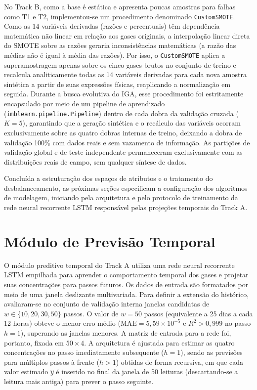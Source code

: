 No Track B, como a base é estática e apresenta poucas amostras para falhas como T1 e T2, implementou-se um procedimento denominado \texttt{CustomSMOTE}. Como as 14 variáveis derivadas (razões e percentuais) têm dependência matemática não linear em relação aos gases originais, a interpolação linear direta do SMOTE sobre as razões geraria inconsistências matemáticas (a razão das médias não é igual à média das razões). Por isso, o \texttt{CustomSMOTE} aplica a superamostragem apenas sobre os cinco gases brutos no conjunto de treino e recalcula analiticamente todas as 14 variáveis derivadas para cada nova amostra sintética a partir de suas expressões físicas, reaplicando a normalização em seguida. Durante a busca evolutiva do IGA, esse procedimento foi estritamente encapsulado por meio de um pipeline de aprendizado (\texttt{imblearn.pipeline.Pipeline}) dentro de cada dobra da validação cruzada ($K=5$), garantindo que a geração sintética e o recálculo das variáveis ocorram exclusivamente sobre as quatro dobras internas de treino, deixando a dobra de validação 100\% com dados reais e sem vazamento de informação. As partições de validação global e de teste independente permaneceram exclusivamente com as distribuições reais de campo, sem qualquer síntese de dados.

Concluída a estruturação dos espaços de atributos e o tratamento do desbalanceamento, as próximas seções especificam a configuração dos algoritmos de modelagem, iniciando pela arquitetura e pelo protocolo de treinamento da rede neural recorrente LSTM responsável pelas projeções temporais do Track A.

\section{Módulo de Previsão Temporal}\label{sec:modulo_lstm}

O módulo preditivo temporal do Track A utiliza uma rede neural recorrente LSTM empilhada para aprender o comportamento temporal dos gases e projetar suas concentrações para passos futuros. Os dados de entrada são formatados por meio de uma janela deslizante multivariada. Para definir a extensão do histórico, avaliaram-se no conjunto de validação interna janelas candidatas de $w \in \{10, 20, 30, 50\}$ passos. O valor de $w = 50$ passos (equivalente a 25 dias a cada 12 horas) obteve o menor erro médio ($\text{MAE} = 5,59 \times 10^{-5}$ e $R^2 > 0,999$ no passo $h=1$), superando as janelas menores. A matriz de entrada para a rede foi, portanto, fixada em $50 \times 4$. A arquitetura é ajustada para estimar as quatro concentrações no passo imediatamente subsequente ($h = 1$), sendo as previsões para múltiplos passos à frente ($h > 1$) obtidas de forma recursiva, em que cada valor estimado $\hat{y}$ é inserido no final da janela de 50 leituras (descartando-se a leitura mais antiga) para prever o passo seguinte.

